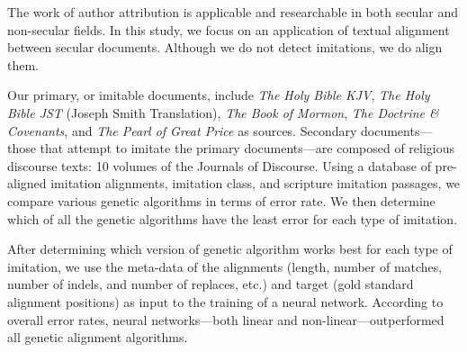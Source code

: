 
The work of author attribution is applicable and researchable in both secular and non-secular fields. In this study, we focus on an application of textual alignment between secular documents. Although we do not detect imitations, we do align them. 

Our primary, or imitable documents, include \textit{The Holy Bible KJV}, \textit{The Holy Bible JST} (Joseph Smith Translation), \textit{The Book of Mormon}, \textit{The Doctrine \& Covenants}, and \textit{The Pearl of Great Price} as sources. Secondary documents---those that attempt to imitate the primary documents---are composed of religious discourse texts: 10 volumes of the Journals of Discourse. %
Using a database of pre-aligned imitation alignments, imitation class, and scripture imitation passages, we compare various genetic algorithms in terms of error rate. %
We then determine which of all the genetic algorithms have the least error for each type of imitation.

After determining which version of genetic algorithm works best for each type of imitation, we use the meta-data of the alignments (length, number of matches, number of indels, and number of replaces, etc.) and target (gold standard alignment positions) as input to the training of a neural network. %
According to overall error rates, neural networks---both linear and non-linear---outperformed all genetic alignment algorithms. %

